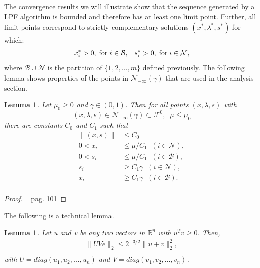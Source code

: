 \documentclass[a4paper,10 pt,titlepage,twoside]{book}
\theoremstyle{plain}
\newtheorem{lem}[thm]{Lemma}
\theoremstyle{definition}
\theoremstyle{remark}
\begin{document}
The convergence results we will illustrate show that the sequence generated by a LPF algorithm is bounded and therefore has at least one limit point. Further, all limit points correspond to strictly complementary solutions $(x^{*},\lambda^{*},s^{*})$ for which:
\begin{align*}
&x^{*}_{i}>0, \text{\;for\;} i \in\mathcal{B},
&s^{*}_{i}>0, \text{\;for\;} i \in\mathcal{N},
\end{align*}
where $\mathcal{B}\cup\mathcal{N}$ is the partition of $\{1,2,\dots,m\}$ defined previously.
The following lemma shows properties of the points in $\mathcal{N}_{-\infty}(\gamma)$ that are used in the analysis section.
\begin{lem}
	Let $\mu_{0}\geq 0$ and $\gamma\in(0,1)$. Then for all points $(x,\lambda,s)$ with
	\begin{equation*}
	(x,\lambda,s)\in\mathcal{N}_{-\infty}(\gamma)\subset\mathcal{F}^{0}, \;\; \mu \leq \mu_{0}
	\end{equation*}
	there are constants $C_{0}$ and $C_{1}$ such that
	\begin{align*}
	\lVert(x,s) \rVert&\leq C_{0}\\0< x_{i}&\leq \mu/C_{1}\;\; (i \in\mathcal{N}),\\
	0< s_{i}&\leq \mu/C_{1}\;\; (i \in\mathcal{B}),\\ 
	s_{i}&\geq C_{1}\gamma \;\; (i \in\mathcal{N}),\\
	x_{i}&\geq C_{1}\gamma \;\; (i \in\mathcal{B}).\\
	\end{align*}
\end{lem}
\begin{proof}
	~\cite{Wright} pag. 101
\end{proof}
The following is a technical lemma.
\begin{lem}\label{lem1}
	Let u and v be any two vectors in $\mathbb{R}^{n}$ with $u^{T}v \geq 0$. Then, 
	\begin{align*}
	\lVert UVe \rVert_{2}\leq 2^{-3/2}\lVert u + v \rVert^{2}_{2},\\
	\end{align*}
	with $U = diag(u_{1}, u_{2}, ..., u_{n})$ and $V = diag(v_{1}, v_{2}, ..., v_{n})$. 
\end{lem}
\end{document}
